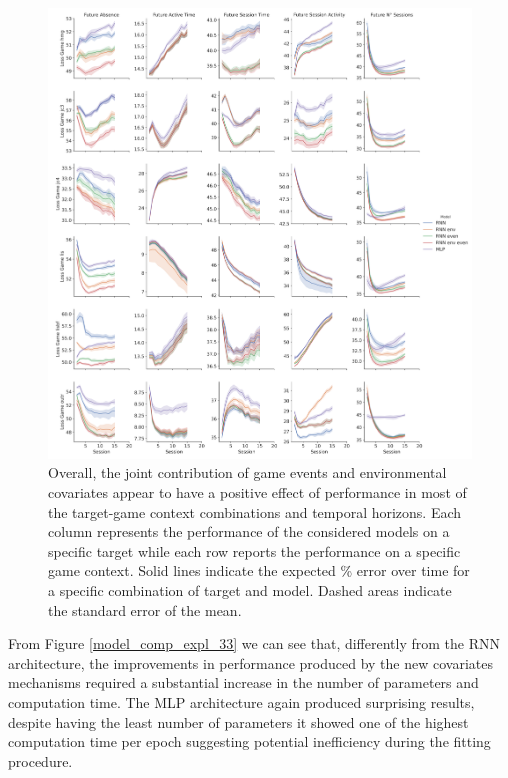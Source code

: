 \begin{figure}[h]
\centering
\includegraphics[height=0.5\textheight,keepaspectratio]{images/chapter_3/models_comparison_non_collapsed_33.png}
\caption[\textbf{Model comparison without collapsing}]{Overall, the joint contribution of game events and environmental covariates appear to have a positive effect of performance in most of the target-game context combinations and temporal horizons. Each column represents the performance of the considered models on a specific target while each row reports the performance on a specific game context. Solid lines indicate the expected \% error over time for a specific combination of target and model. Dashed areas indicate the standard error of the mean.}
\label{model_comp_non_coll_33} 
\end{figure}
From Figure \ref{model_comp_expl_33} we can see that, differently from the RNN architecture, the improvements in performance produced by the new covariates mechanisms required a substantial increase in the number of parameters and computation time. The MLP architecture again produced surprising results, despite having the least number of parameters it showed one of the highest computation time per epoch suggesting potential inefficiency during the fitting procedure.
